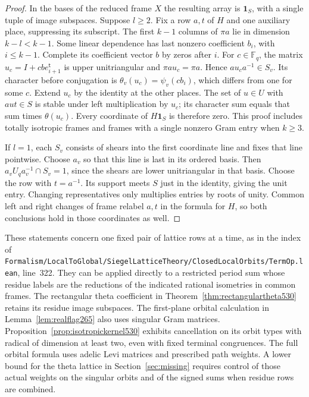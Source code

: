 \documentclass[a4paper,11pt]{article}
\theoremstyle{definition}
\theoremstyle{remark}
\newcommand{\srcloc}[2]{{\small\nolinkurl{#1.lean}}, line~#2}
\numberwithin{equation}{section}
\begin{document}
\begin{proof}
In the bases of the reduced frame \(X\) the resulting array
is \(\mathbf1_S\), with a single tuple of image subspaces.
Suppose \(l\ge2\). Fix a row \(a,t\) of \(H\) and one auxiliary
place, suppressing its subscript. The first \(k-1\) columns of
\(\pi a\) lie in dimension \(k-l<k-1\). Some linear dependence
has last nonzero coefficient \(b_i\), with \(i\le k-1\).
Complete its coefficient vector \(b\) by zeros after \(i\).
For \(c\in\mathbb F_q\), the matrix \(u_c=I+c b e_{i+1}^{\mathsf t}\)
is upper unitriangular and \(\pi a u_c=\pi a\).
Hence \(a u_c a^{-1}\in S_v\). Its character before conjugation
is \(\theta_v(u_c)=\psi_v(c b_i)\), which differs from one for
some \(c\). Extend \(u_c\) by the identity at the other places.
The set of \(u\in U\) with \(aut\in S\) is stable under left
multiplication by \(u_c\); its character sum equals that sum
times \(\theta(u_c)\). Every coordinate of \(H\mathbf1_S\) is
therefore zero. This proof includes totally isotropic frames
and frames with a single nonzero Gram entry when \(k\ge3\).

If \(l=1\), each \(S_v\) consists of shears into the first
coordinate line and fixes that line pointwise. Choose \(a_v\)
so that this line is last in its ordered basis. Then
\(a_v U_q a_v^{-1}\cap S_v=1\), since the shears are lower
unitriangular in that basis. Choose the row with \(t=a^{-1}\).
Its support meets \(S\) just in the identity, giving the unit
entry. Changing representatives only multiplies entries by roots
of unity. Common left and right changes of frame relabel \(a,t\)
in the formula for \(H\), so both conclusions hold in those
coordinates as well.
\end{proof}

These statements concern one fixed pair of lattice rows at a
time, as in the index of
\srcloc{Formalism/LocalToGlobal/SiegelLatticeTheory/ClosedLocalOrbits/TermOp}{322}.
They can be applied directly to a restricted period sum whose
residue labels are the reductions of the indicated rational
isometries in common frames. The rectangular theta coefficient in
Theorem~\ref{thm:rectangulartheta530} retains its residue image
subspaces. The first-plane orbital calculation in
Lemma~\ref{lem:realflag265} also uses singular Gram matrices.
Proposition~\ref{prop:isotropickernel530} exhibits cancellation
on its orbit types with radical of dimension at least two, even
with fixed terminal congruences.
The full orbital formula uses adelic Levi matrices and prescribed
path weights. A lower bound for the theta lattice in
Section~\ref{sec:missing} requires control of those actual
weights on the singular orbits and of the signed sums when
residue rows are combined.
\end{document}
